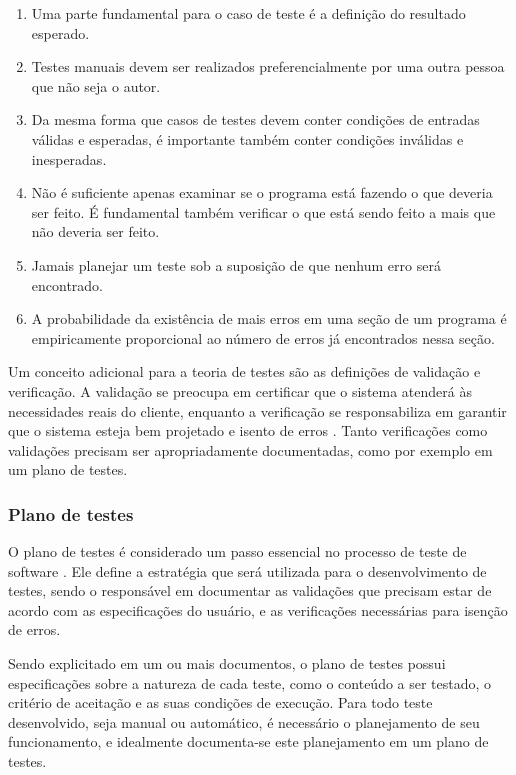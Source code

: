 \begin{enumerate}
    \item Uma parte fundamental para o caso de teste é a definição do resultado esperado.
    \item Testes manuais devem ser realizados preferencialmente por uma outra pessoa que não seja o autor.
    \item Da mesma forma que casos de testes devem conter condições de entradas válidas e esperadas, é importante também conter condições inválidas e inesperadas.
    \item Não é suficiente apenas examinar se o programa está fazendo o que deveria ser feito. É fundamental também verificar o que está sendo feito a mais que não deveria ser feito.
    \item Jamais planejar um teste sob a suposição de que nenhum erro será encontrado.
    \item A probabilidade da existência de mais erros em uma seção de um programa é empiricamente proporcional ao número de erros já encontrados nessa seção.
\end{enumerate}

Um conceito adicional para a teoria de testes são as definições de validação e verificação. A validação se preocupa em certificar que o sistema atenderá às necessidades reais do cliente, enquanto a verificação se responsabiliza em garantir que o sistema esteja bem projetado e isento de erros \cite{pham2003software}. Tanto verificações como validações precisam ser apropriadamente documentadas, como por exemplo em um plano de testes.

\hypertarget{teoria-do-plano-de-testes}{%
\subsubsection{Plano de testes}\label{teoria-do-plano-de-testes}}

O plano de testes é considerado um passo essencial no processo de teste de software \cite{nguyen}. Ele define a estratégia que será utilizada para o desenvolvimento de testes, sendo o responsável em documentar as validações que precisam estar de acordo com as especificações do usuário, e as verificações necessárias para isenção de erros.

Sendo explicitado em um ou mais documentos, o plano de testes possui especificações sobre a natureza de cada teste, como o conteúdo a ser testado, o critério de aceitação e as suas condições de execução. Para todo teste desenvolvido, seja manual ou automático, é necessário o planejamento de seu funcionamento, e idealmente documenta-se este planejamento em um plano de testes.

